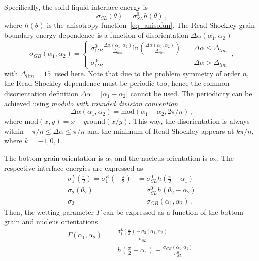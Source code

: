Specifically, the solid-liquid interface energy is
\begin{equation}
	\sigma_{SL}(\theta)=\sigma_{SL}^0h(\theta) \,,
\end{equation}
where $h(\theta)$ is the anisotropy function~\eqref{eq_anisofun}. The Read-Shockley grain boundary energy dependence is a function of disorientation $\Delta\alpha(\alpha_1,\alpha_2)$
\begin{equation}\label{eq_GBE_read_shockley}
	\sigma_{GB}(\alpha_1,\alpha_2) = \left\{ \begin{array}{ll}
		\sigma_{GB}^0\frac{\Delta\alpha(\alpha_1,\alpha_2)}{\Delta_{lim}}\mathrm{ln}\left(\frac{\Delta\alpha(\alpha_1,\alpha_2)}{\Delta_{lim}}\right) & \quad \Delta\alpha\leq \Delta_{lim} \\
		\sigma_{GB}^0 & \quad\Delta\alpha> \Delta_{lim}
	\end{array} \right. \,,
\end{equation}
with $\Delta_{lim}=15$\textdegree~used here. Note that due to the problem symmetry of order $n$, the Read-Shockley dependence must be periodic too, hence the common disorientation definition $\Delta\alpha=|\alpha_1-\alpha_2|$ cannot be used. The periodicity can be achieved using \textit{modulo with rounded division convention}~\cite{wiki_modulo}
\begin{equation}
	\Delta\alpha(\alpha_1,\alpha_2) = \mathrm{mod}(\alpha_1-\alpha_2,2\pi/n) \,, 
\end{equation}
where $\mathrm{mod}(x,y)=x-y\mathrm{round}(x/y)$. This way, the disorientation is always within $-\pi/n\leq \Delta\alpha \leq \pi/n$ and the minimum of Read-Shockley appears at  $k\pi/n $, where $k=-1,0,1$.

The bottom grain orientation is $\alpha_1$ and the nucleus orientation is $\alpha_2$. The respective interface energies are expressed as
\begin{align}
	\label{eq_problemspec_sig1} \textstyle  \sigma_{1}^L\left(\frac{\pi}{2}\right)= \sigma_{1}^R\left(-\frac{\pi}{2}\right) &= \textstyle\sigma_{SL}^0h\left(\frac{\pi}{2}-\alpha_1\right) \\
	\label{eq_problemspec_sig2} \sigma_{2}(\theta_{2})&=\sigma_{SL}^0h(\theta_{2}-\alpha_2) \\
	\label{eq_problemspec_sig3} \sigma_{3} &= \sigma_{GB}(\alpha_1,\alpha_2) \,.
\end{align}
Then, the wetting parameter $\Gamma$ can be expressed as a function of the bottom grain and nucleus orientations
\begin{align}
	\Gamma(\alpha_1,\alpha_2) &= \frac{\sigma_{1}^L(\frac{\pi}{2})-\sigma_{3}(\alpha_1,\alpha_2)}{\sigma_{SL}^0} \\
	&= h(\textstyle\frac{\pi}{2}-\alpha_1) -\displaystyle\frac{\sigma_{GB}(\alpha_1,\alpha_2)}{\sigma_{SL}^0} \,. \label{eq_wetting_param_Gamma}
\end{align}

